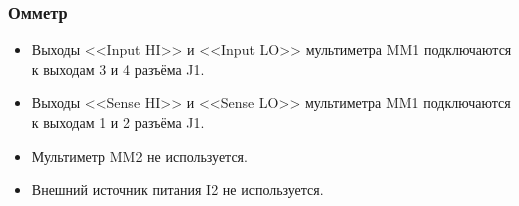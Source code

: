 \subsubsection{Омметр}

    \begin{itemize}
        \item Выходы <<Input HI>> и <<Input LO>> мультиметра MM1 подключаются к выходам 3 и 4 разъёма J1. 
        \item Выходы <<Sense HI>> и <<Sense LO>> мультиметра MM1 подключаются к выходам 1 и 2 разъёма J1. 
        \item Мультиметр MM2 не используется. 
        \item Внешний источник питания I2 не используется. 
    \end{itemize}
